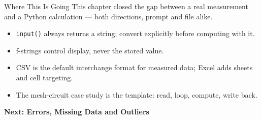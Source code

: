 \documentclass[9pt,aspectratio=169,xcolor=table]{beamer}
\begin{document}
\begin{frame}{Where This Is Going}
    \leavevmode
    \small
    This chapter closed the gap between a real measurement and a
    Python calculation --- both directions, prompt and file alike.

    \vspace{3mm}
    \begin{itemize}
        \item \texttt{input()} always returns a string; convert
              explicitly before computing with it.
        \item f-strings control \alert{display}, never the stored
              value.
        \item CSV is the default interchange format for measured
              data; Excel adds sheets and cell targeting.
        \item The mesh-circuit case study is the template: read,
              loop, compute, write back.
    \end{itemize}

    \vspace{4mm}
    \begin{center}
        \large\color{primary}\textbf{Next: Errors, Missing Data and Outliers}
    \end{center}
\end{frame}
\end{document}

